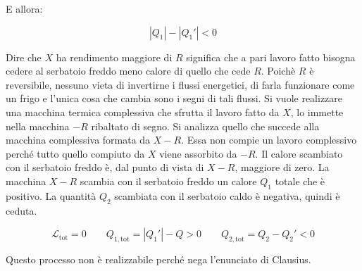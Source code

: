 E allora:

\[
	|Q_1| - |Q_1'| < 0
\]

Dire che $X$ ha rendimento maggiore di $R$ significa che a pari lavoro fatto bisogna cedere al serbatoio freddo meno calore di quello che cede $R$. Poichè $R$ è reversibile, nessuno vieta di invertirne i flussi energetici, di farla funzionare come un frigo e l'unica cosa che cambia sono i segni di tali flussi. Si vuole realizzare una macchina termica complessiva che sfrutta il lavoro fatto da $X$, lo immette nella macchina $-R$ ribaltato di segno. Si analizza quello che succede alla macchina complessiva formata da $X - R$. Essa non compie un lavoro complessivo perché tutto quello compiuto da $X$ viene assorbito da $-R$. Il calore scambiato con il serbatoio freddo è, dal punto di vista di $X-R$, maggiore di zero. La macchina $X-R$ scambia con il serbatoio freddo un calore $Q_1$ totale che è positivo. La quantità $Q_2$ scambiata con il serbatoio caldo è negativa, quindi è ceduta.

\[
	\mathcal{L}_{\text{tot} } = 0 \qquad Q_{1,\text{tot} } = |Q_1'| - Q > 0 \qquad Q_{2,\text{tot} } = Q_2 - Q_2' < 0
\]

Questo processo non è realizzabile perché nega l'enunciato di Clausius.


